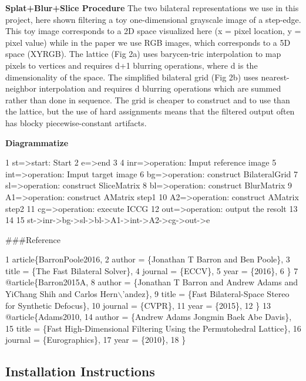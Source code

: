 \begin{DoxyItemize}
\item {\bfseries Splat+\+Blur+\+Slice Procedure}  The two bilateral representations we use in this project, here shown filtering a toy one-\/dimensional grayscale image of a step-\/edge. This toy image corresponds to a 2D space visualized here (x = pixel location, y = pixel value) while in the paper we use R\+GB images, which corresponds to a 5D space (X\+Y\+R\+GB). The lattice (Fig 2a) uses barycen-\/tric interpolation to map pixels to vertices and requires d+1 blurring operations, where d is the dimensionality of the space. The simplified bilateral grid (Fig 2b) uses nearest-\/neighbor interpolation and requires d blurring operations which are summed rather than done in sequence. The grid is cheaper to construct and to use than the lattice, but the use of hard assignments means that the filtered output often has blocky piecewise-\/constant artifacts.
\item {\bfseries Diagrammatize} 
\begin{DoxyCode}
1 st=>start: Start
2 e=>end
3 
4 inr=>operation: Imput reference image
5 int=>operation: Imput target image
6 bg=>operation: construct BilateralGrid
7 sl=>operation: construct SliceMatrix
8 bl=>operation: construct BlurMatrix
9 A1=>operation: construct AMatrix step1
10 A2=>operation: construct AMatrix step2
11 cg=>operation: execute ICCG
12 out=>operation: output the resolt
13 
14 
15 st->inr->bg->sl->bl->A1->int->A2->cg->out->e
\end{DoxyCode}

\end{DoxyItemize}

\#\#\#\+Reference 
\begin{DoxyCode}
1 article\{BarronPoole2016,
2 author = \{Jonathan T Barron and Ben Poole\},
3 title = \{The Fast Bilateral Solver\},
4 journal = \{ECCV\},
5 year = \{2016\},
6 \}
7 @article\{Barron2015A,
8 author = \{Jonathan T Barron and Andrew Adams and YiChang Shih and Carlos Hern\(\backslash\)'andez\},
9 title = \{Fast Bilateral-Space Stereo for Synthetic Defocus\},
10 journal = \{CVPR\},
11 year = \{2015\},
12 \}
13 @article\{Adams2010,
14 author = \{Andrew Adams  Jongmin Baek    Abe Davis\},
15 title = \{Fast High-Dimensional Filtering Using the Permutohedral Lattice\},
16 journal = \{Eurographics\},
17 year = \{2010\},
18 \}
\end{DoxyCode}
 

 \subsection*{Installation Instructions}

